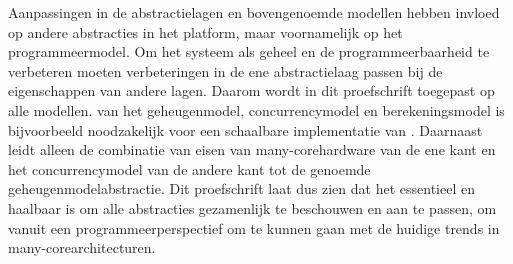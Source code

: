 Aanpassingen in de abstractielagen en bovengenoemde modellen hebben invloed op andere abstracties in het platform, maar voornamelijk op het programmeermodel.
Om het systeem als geheel en de programmeerbaarheid te verbeteren moeten verbeteringen in de ene abstractielaag passen bij de eigenschappen van andere lagen.
Daarom wordt in dit proefschrift \emph{\codesign} toegepast op alle modellen.
\Codesign van het geheugenmodel, concurrencymodel en berekeningsmodel is bijvoorbeeld noodzakelijk voor een schaalbare implementatie van \lcalc.
Daarnaast leidt alleen de combinatie van eisen van many-core\-hardware van de ene kant en het concurrencymodel van de andere kant tot de genoemde geheugenmodelabstractie.
Dit proefschrift laat dus zien dat het essentieel en haalbaar is om alle abstracties gezamenlijk te beschouwen en aan te passen, om vanuit een programmeerperspectief om te kunnen gaan met de huidige trends in many-core\-architecturen.

